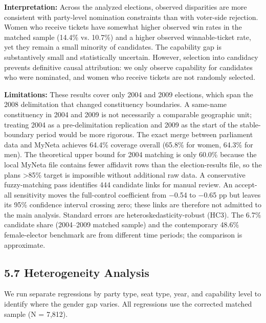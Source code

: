 \documentclass[
]{article}
\begin{document}
\textbf{Interpretation:} Across the analyzed elections, observed disparities are more consistent with party-level nomination constraints than with voter-side rejection. Women who receive tickets have somewhat higher observed win rates in the matched sample (14.4\% vs. 10.7\%) and a higher observed winnable-ticket rate, yet they remain a small minority of candidates. The capability gap is substantively small and statistically uncertain. However, selection into candidacy prevents definitive causal attribution: we only observe capability for candidates who were nominated, and women who receive tickets are not randomly selected.

\textbf{Limitations:} These results cover only 2004 and 2009 elections, which span the 2008 delimitation that changed constituency boundaries. A same-name constituency in 2004 and 2009 is not necessarily a comparable geographic unit; treating 2004 as a pre-delimitation replication and 2009 as the start of the stable-boundary period would be more rigorous. The exact merge between parliament data and MyNeta achieves 64.4\% coverage overall (65.8\% for women, 64.3\% for men). The theoretical upper bound for 2004 matching is only 60.0\% because the local MyNeta file contains fewer affidavit rows than the election-results file, so the plan\textquotesingle s \textgreater85\% target is impossible without additional raw data. A conservative fuzzy-matching pass identifies 444 candidate links for manual review. An accept-all sensitivity moves the full-control coefficient from $-$0.54 to $-$0.65 pp but leaves its 95\% confidence interval crossing zero; these links are therefore not admitted to the main analysis. Standard errors are heteroskedasticity-robust (HC3). The 6.7\% candidate share (2004--2009 matched sample) and the contemporary 48.6\% female-elector benchmark are from different time periods; the comparison is approximate.

\subsection{5.7 Heterogeneity Analysis}\label{57-heterogeneity-analysis}

We run separate regressions by party type, seat type, year, and capability level to identify where the gender gap varies. All regressions use the corrected matched sample (N = 7,812).
\end{document}
